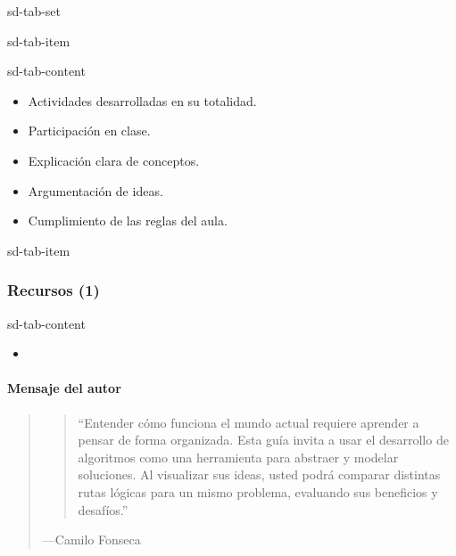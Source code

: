 \documentclass[letterpaper,10pt,spanish]{sphinxmanual}
\begin{document}
\begin{sphinxuseclass}{sd-tab-set}
\begin{sphinxuseclass}{sd-tab-item}
\begin{sphinxuseclass}{sd-tab-content}\begin{itemize}
\item {} 
\sphinxAtStartPar
Actividades desarrolladas en su totalidad.

\item {} 
\sphinxAtStartPar
Participación en clase.

\item {} 
\sphinxAtStartPar
Explicación clara de conceptos.

\item {} 
\sphinxAtStartPar
Argumentación de ideas.

\item {} 
\sphinxAtStartPar
Cumplimiento de las reglas del aula.

\end{itemize}

\end{sphinxuseclass}
\end{sphinxuseclass}
\begin{sphinxuseclass}{sd-tab-item}\subsubsection*{Recursos (1)}

\begin{sphinxuseclass}{sd-tab-content}\begin{itemize}
\item {} 
\sphinxAtStartPar
{\hyperref[\detokenize{cursos/ofimatica11/recursos/T03::doc}]{}}

\end{itemize}

\end{sphinxuseclass}
\end{sphinxuseclass}
\end{sphinxuseclass}

\paragraph{Mensaje del autor}
\label{\detokenize{cursos/ofimatica11/periodo01/G03:mensaje-del-autor}}\begin{quote}
\begin{quote}

\sphinxAtStartPar
“Entender cómo funciona el mundo actual requiere aprender a pensar de forma organizada. Esta guía invita a usar el desarrollo de algoritmos como una herramienta para abstraer y modelar soluciones. Al visualizar sus ideas, usted podrá comparar distintas rutas lógicas para un mismo problema, evaluando sus beneficios y desafíos.”
\end{quote}

\begin{flushright}
---Camilo Fonseca
\end{flushright}
\end{quote}
\end{document}
